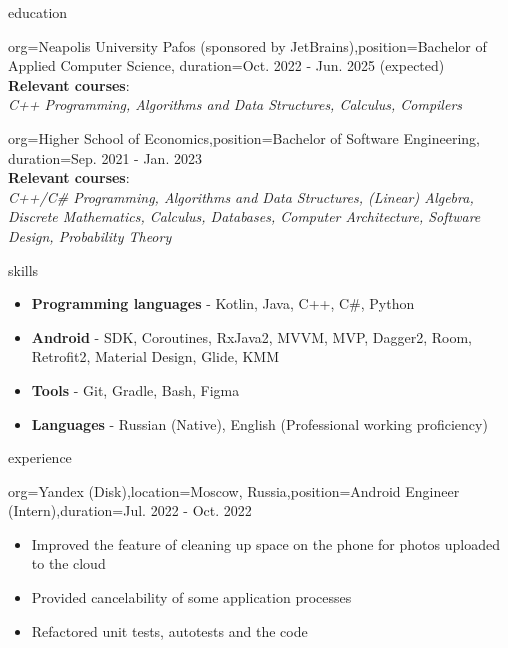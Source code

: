 \documentclass{resume}
\begin{document}
\makeheader

\begin{ResumeSection}{education}
    \begin{ResumeSubsection}{org={Neapolis University Pafos (sponsored by JetBrains)},position={Bachelor of Applied Computer Science}, duration={Oct. 2022 - Jun. 2025 (expected)}} \\
    \textbf{Relevant courses}: \\
    \textit{C++ Programming, Algorithms and Data Structures, Calculus, Compilers} \\
    \end{ResumeSubsection}
    \begin{ResumeSubsection}{org={Higher School of Economics},position={Bachelor of Software Engineering}, duration={Sep. 2021 - Jan. 2023}} \\
    \textbf{Relevant courses}: \\
    \textit{C++/C\# Programming, Algorithms and Data Structures, (Linear) Algebra, Discrete Mathematics, Calculus, Databases, Computer Architecture, Software Design, Probability Theory}
    \end{ResumeSubsection}
\end{ResumeSection}

\begin{ResumeSection}{skills}
    \newcommand{\skill}[2]{\textbf{#1} - #2}
        \begin{itemize}
            \item \skill{Programming languages}{Kotlin, Java, C++, C\#, Python}
            \item \skill{Android}{SDK, Coroutines, RxJava2, MVVM, MVP, Dagger2, Room, Retrofit2, Material Design, Glide, KMM}
            \item \skill{Tools}{Git, Gradle, Bash, Figma}
            \item \skill{Languages}{Russian (Native), English (Professional working proficiency)}
        \end{itemize}
\end{ResumeSection}

\begin{ResumeSection}{experience}
    \begin{ResumeSubsection}{org=Yandex (Disk),location={Moscow, Russia},position={Android Engineer (Intern)},duration=Jul. 2022 - Oct. 2022} 
        \begin{itemize}
            \item Improved the feature of cleaning up space on the phone for photos uploaded to the cloud
            \item Provided cancelability of some application processes
            \item Refactored unit tests, autotests and the code
        \end{itemize}
    \end{ResumeSubsection}
\end{ResumeSection}
\end{document}
